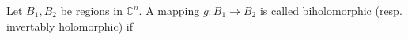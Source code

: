 Let $B_1, B_2$ be regions in $\mathbb{C}^n$. A mapping $g: B_1 \rightarrow B_2$ is called biholomorphic (resp. invertably holomorphic) if
